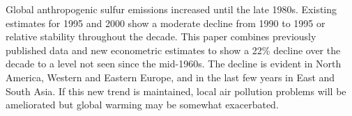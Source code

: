 Global anthropogenic sulfur emissions increased until the late 1980s. Existing estimates for 1995 and 2000 show a moderate decline from 1990 to 1995 or relative stability throughout the decade. This paper combines previously published data and new econometric estimates to show a 22\% decline over the decade to a level not seen since the mid-1960s. The decline is evident in North America, Western and Eastern Europe, and in the last few years in East and South Asia. If this new trend is maintained, local air pollution problems will be ameliorated but global warming may be somewhat exacerbated.
